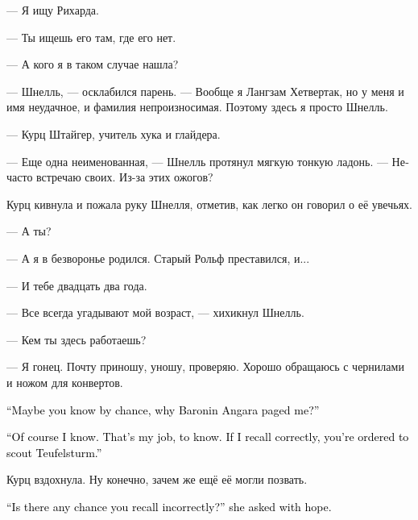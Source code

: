 \documentclass[a4paper,12pt,fleqn]{book}\usepackage{cooltooltips}\usepackage{polyglossia}\setdefaultlanguage[babelshorthands=true]{russian}\setotherlanguage{english}\defaultfontfeatures{Ligatures=TeX,Mapping=tex-text} \usepackage{xcolor}\definecolor{lightgray}{HTML}{bbbbbb}\color{lightgray}\newcommand{\ml}[3]{\textenglish{\textcolor{black}{#3}}}
\begin{document}
--- Я ищу Рихарда.

--- Ты ищешь его там, где его нет.

--- А кого я в таком случае нашла?

--- Шнелль, --- осклабился парень.
--- Вообще я Лангзам Хетвертак, но у меня и имя неудачное, и фамилия непроизносимая.
Поэтому здесь я просто Шнелль.

--- Курц Штайгер, учитель хука и глайдера.

--- Еще одна неименованная, --- Шнелль протянул мягкую тонкую ладонь.
--- Нечасто встречаю своих.
Из-за этих ожогов?

Курц кивнула и пожала руку Шнелля, отметив, как легко он говорил о её увечьях.

--- А ты?

--- А я в безворонье родился.
Старый Рольф преставился, и...

--- И тебе двадцать два года.

--- Все всегда угадывают мой возраст, --- хихикнул Шнелль.

--- Кем ты здесь работаешь?

--- Я гонец.
Почту приношу, уношу, проверяю.
Хорошо обращаюсь с чернилами и ножом для конвертов.

\ml{$0$}
{--- Может быть, ты случайно знаешь, зачем баронин Ангара меня вызвала?}
{``Maybe you know by chance, why Baronin Angara paged me?''}

\ml{$0$}
{--- Знаю, конечно.}
{``Of course I know.}
\ml{$0$}
{Профессия у меня такая --- знать.}
{That's my job, to know.}
\ml{$0$}
{Если мне не изменяет память, тебя отправляют на разведку к Тойфельстурм.}
{If I recall correctly, you're ordered to scout Teufelsturm.''}

Курц вздохнула.
Ну конечно, зачем же ещё её могли позвать.

\ml{$0$}
{--- А если память тебе изменяет? --- с надеждой спросила она.}
{``Is there any chance you recall incorrectly?'' she asked with hope.}
\end{document}
